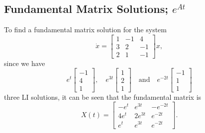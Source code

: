 \subsection{Fundamental Matrix Solutions; $e^{At}$}
\begin{example}
    To find a fundamental matrix solution for the system \[
    \dot x = 
    \begin{bmatrix}
        1 & -1 & 4 \\ 3 & 2 & -1 \\ 2 & 1 & -1
    \end{bmatrix}x,
    \] since we have \[
    e^{t}
    \begin{bmatrix}
        -1 \\ 4 \\1
    \end{bmatrix},\quad e^{3t}
    \begin{bmatrix}
        1 \\ 2 \\ 1
    \end{bmatrix}\quad \text{and} \quad e^{-2t}
    \begin{bmatrix}
        -1 \\ 1 \\ 1
    \end{bmatrix}
    \] three LI solutions, it can be seen that the fundamental matrix is \[
    X(t)=
    \begin{bmatrix}
        -e^{t}& e^{3t} & -e^{-2t}\\
        4e^{t}& 2e^{3t}& e^{-2t}\\
        e^{t}& e^{3t}& e^{-2t}
    \end{bmatrix}.
    \] 
\end{example}
